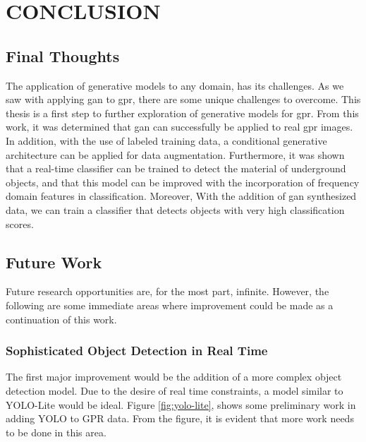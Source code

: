 \chapter{CONCLUSION}

\section{Final Thoughts}
The application of generative models to any domain, has its challenges. As we saw with applying \acrshort{gan} to \acrshort{gpr}, there are some unique challenges to overcome. This thesis is a first step to further exploration of generative models for \acrshort{gpr}. From this work, it was determined that \acrshort{gan} can successfully be applied to real \acrshort{gpr} images. In addition, with the use of labeled training data, a conditional generative architecture can be applied for data augmentation. Furthermore, it was shown that a real-time classifier can be trained to detect the material of underground objects, and that this model can be improved with the incorporation of frequency domain features in classification. Moreover, With the addition of \acrshort{gan} synthesized data, we can train a classifier that detects objects with very high classification scores.

\section{Future Work}
Future research opportunities are, for the most part, infinite. However, the following are some immediate areas where improvement could be made as a continuation of this work.

\subsection{Sophisticated Object Detection in Real Time}
The first major improvement would be the addition of a more complex object detection model. Due to the desire of real time constraints, a model similar to YOLO-Lite \cite{yolo-lite} would be ideal. Figure \ref{fig:yolo-lite}, shows some preliminary work in adding YOLO to GPR data. From the figure, it is evident that more work needs to be done in this area. 

